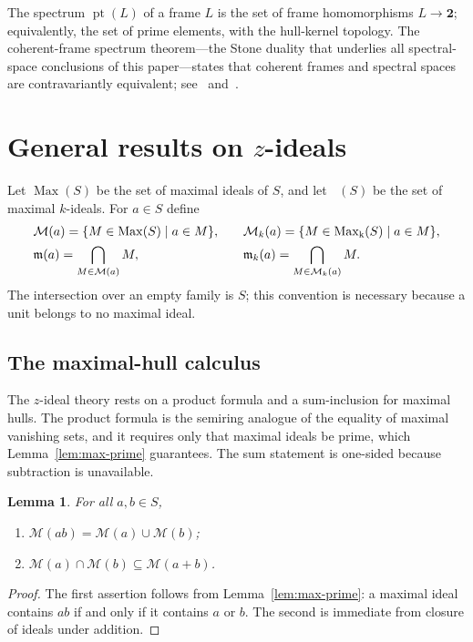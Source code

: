 \documentclass[11pt,leqno]{amsart}
\theoremstyle{plain}
\newtheorem{lemma}[theorem]{Lemma}
\theoremstyle{definition}
\theoremstyle{remark}
\numberwithin{equation}{section}
\DeclareMathOperator{\Max}{Max}
\DeclareMathOperator{\Maxk}{Max_k}
\DeclareMathOperator{\pt}{pt}
\newcommand{\M}{\mathcal M}
\newcommand{\Mk}{\mathcal M_k}
\newcommand{\mfrak}{\mathfrak m}
\newcommand{\two}{\mathbf 2}
\begin{document}
The spectrum $\pt(L)$ of a frame $L$ is the set of frame homomorphisms
$L\to\two$; equivalently, the set of prime elements, with the
hull-kernel topology.
The coherent-frame spectrum theorem---the Stone duality that underlies
all spectral-space conclusions of this paper---states that coherent
frames and spectral spaces are contravariantly equivalent;
see~\cite[Ch.~II, Cor.~3.4]{Johnstone} and~\cite{Hochster}.

\section{General results on \texorpdfstring{$z$}{z}-ideals}
\label{sec:general}

Let $\Max(S)$ be the set of maximal ideals of $S$, and let
$\Maxk(S)$ be the set of maximal $k$-ideals.
For $a\in S$ define
\begin{equation}\label{eq:max-hulls}
\begin{array}{l@{\qquad}l}
\M(a)=\{M\in\Max(S)\mid a\in M\},&
\Mk(a)=\{M\in\Maxk(S)\mid a\in M\},\\[4pt]
\mfrak(a)=\displaystyle\bigcap_{M\in\M(a)}M,&
\mfrak_k(a)=\displaystyle\bigcap_{M\in\Mk(a)}M.
\end{array}
\end{equation}
The intersection over an empty family is $S$;
this convention is necessary because a unit belongs to no
maximal ideal.

\subsection{The maximal-hull calculus}

The $z$-ideal theory rests on a product formula and a
sum-inclusion for maximal hulls.
The product formula is the semiring analogue of the equality of
maximal vanishing sets, and it requires only that maximal ideals
be prime, which Lemma~\ref{lem:max-prime} guarantees.
The sum statement is one-sided because subtraction is unavailable.

\begin{lemma}\label{loc6}
For all $a,b\in S$,
\begin{enumerate}
\item $\M(ab)=\M(a)\cup\M(b)$;
\item $\M(a)\cap\M(b)\subseteq\M(a+b)$.
\end{enumerate}
\end{lemma}
\begin{proof}
The first assertion follows from Lemma~\ref{lem:max-prime}:
a maximal ideal contains $ab$ if and only if it contains $a$ or $b$.
The second is immediate from closure of ideals under addition.
\end{proof}
\end{document}
